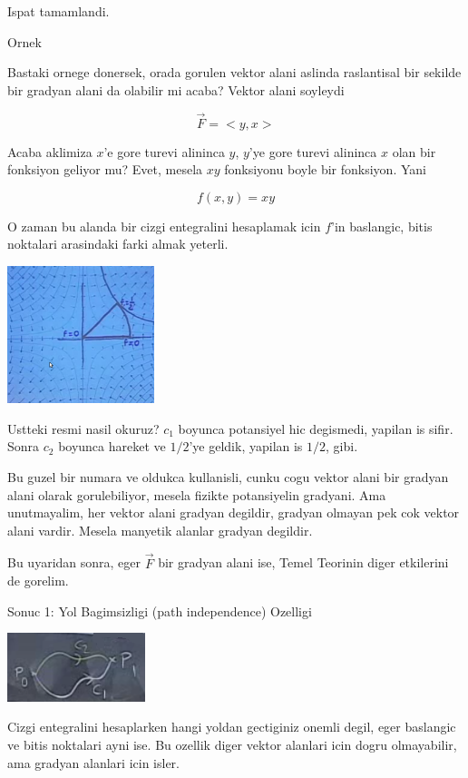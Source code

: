 \documentclass[12pt,fleqn]{article}
\begin{document}
Ispat tamamlandi. 

Ornek

Bastaki ornege donersek, orada gorulen vektor alani aslinda raslantisal bir
sekilde bir gradyan alani da olabilir mi acaba? Vektor alani soyleydi

\[ \vec{F} = <y,x> \]

Acaba aklimiza $x$'e gore turevi alininca $y$, $y$'ye gore turevi alininca
$x$ olan bir fonksiyon geliyor mu? Evet, mesela $xy$ fonksiyonu boyle bir
fonksiyon. Yani

\[ f(x,y) = xy \]

O zaman bu alanda bir cizgi entegralini hesaplamak icin $f$'in baslangic,
bitis noktalari arasindaki farki almak yeterli. 

\includegraphics[height=4cm]{20_6.png}

Ustteki resmi nasil okuruz? $c_1$ boyunca potansiyel hic degismedi, yapilan
is sifir. Sonra $c_2$ boyunca hareket ve $1/2$'ye geldik, yapilan is $1/2$,
gibi. 

Bu guzel bir numara ve oldukca kullanisli, cunku cogu vektor alani bir
gradyan alani olarak gorulebiliyor, mesela fizikte potansiyelin
gradyani. Ama unutmayalim, her vektor alani gradyan degildir, gradyan
olmayan pek cok vektor alani vardir. Mesela manyetik alanlar gradyan
degildir. 

Bu uyaridan sonra, eger $\vec{F}$ bir gradyan alani ise, Temel Teorinin
diger etkilerini de gorelim. 

Sonuc 1: Yol Bagimsizligi (path independence) Ozelligi

\includegraphics[height=2cm]{20_7.png}

Cizgi entegralini hesaplarken hangi yoldan gectiginiz onemli degil, eger
baslangic ve bitis noktalari ayni ise. Bu ozellik diger vektor alanlari
icin dogru olmayabilir, ama gradyan alanlari icin isler.
\end{document}
